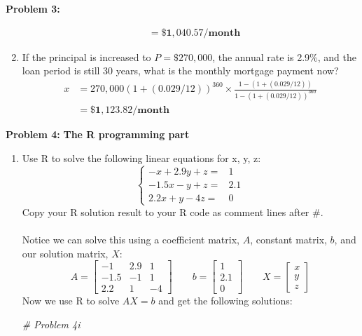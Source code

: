 \documentclass[11pt]{article}
\newenvironment{problem}[1]{\textbf{Problem #1: }}{\newpage}
\newenvironment{Shaded}{\begin{snugshade}}{\end{snugshade}}
\newcommand{\CommentTok}[1]{\textcolor[rgb]{0.56,0.35,0.01}{\textit{#1}}}
\begin{document}
\begin{problem}{3}
\begin{enumerate}[label = (\alph*)]
\begin{align*}
				&= \boldsymbol{\$1,040.57 / \textbf{month}}
			\end{align*}
			\item If the principal is increased to $P = \$270, 000$, the annual rate is 2.9\%, and the loan period is
			still 30 years, what is the monthly mortgage payment now?
			\begin{align*}
				x &= 270,000(1 + (0.029 / 12))^{360} \times \frac{1 - (1 + (0.029 / 12))}{1 - (1 + (0.029 / 12))^{360}} \\
				&= \boldsymbol{\$1,123.82 / \textbf{month}}
			\end{align*}
		\end{enumerate}
	\end{problem}

	\begin{problem}{4}
		\textbf{The R programming part}
		\begin{enumerate}[label = (\roman*)]
			\item Use R to solve the following linear equations for x, y, z:
			\[\begin{cases}
				-x + 2.9y  + z = & 1 \\
				-1.5x - y + z = & 2.1 \\
				2.2x + y - 4z = & 0
			\end{cases}\]
			Copy your R solution result to your R code as comment lines after \#. 
			\\ \\
			Notice we can solve this using a coefficient matrix, $A$, constant matrix, $b$, and our solution matrix, $X$:
			\[A = \begin{bmatrix}
				-1 & 2.9 & 1 \\ -1.5 & -1 & 1 \\ 2.2 & 1 & -4
			\end{bmatrix} \qquad b = \begin{bmatrix}
				1 \\ 2.1 \\ 0
			\end{bmatrix} \qquad X = \begin{bmatrix}
				x \\ y \\ z
			\end{bmatrix}\]
			Now we use R to solve $AX = b$ and get the following solutions:
			\\ 
\begin{Shaded}
\begin{Highlighting}[]
\CommentTok{# Problem 4i}


\end{Highlighting}
\end{Shaded}
\end{enumerate}
\end{problem}
\end{document}
